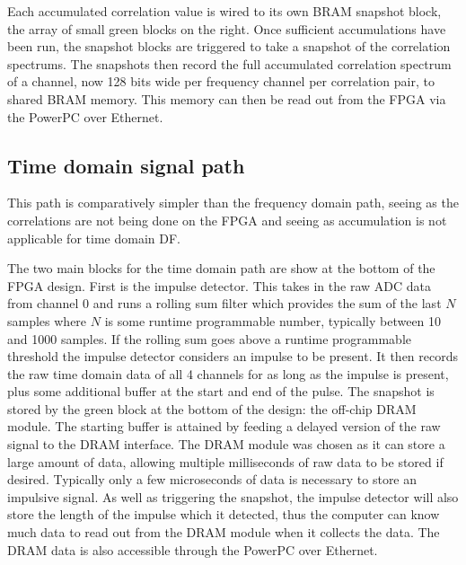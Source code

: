 Each accumulated correlation value is wired to its own BRAM snapshot block, the array of small green blocks on the right. Once sufficient accumulations have been run, the snapshot blocks are triggered to take a snapshot of the correlation spectrums. The snapshots then record the full accumulated correlation spectrum of a channel, now 128 bits wide per frequency channel per correlation pair, to shared BRAM memory. This memory can then be read out from the FPGA via the PowerPC over Ethernet.

\subsection{Time domain signal path}
This path is comparatively simpler than the frequency domain path, seeing as the correlations are not being done on the FPGA and seeing as accumulation is not applicable for time domain DF. 

The two main blocks for the time domain path are show at the bottom of the FPGA design. First is the impulse detector. This takes in the raw ADC data from channel 0 and runs a rolling sum filter which provides the sum of the last \(N\) samples where \(N\) is some runtime programmable number, typically between 10 and 1000 samples. If the rolling sum goes above a runtime programmable threshold the impulse detector considers an impulse to be present. It then records the raw time domain data of all 4 channels for as long as the impulse is present, plus some additional buffer at the start and end of the pulse.  The snapshot is stored by the green block at the bottom of the design: the off-chip DRAM module. The starting buffer is attained by feeding a delayed version of the raw signal to the DRAM interface. The DRAM module was chosen as it can store a large amount of data, allowing multiple milliseconds of raw data to be stored if desired. Typically only a few microseconds of data is necessary to store an impulsive signal. As well as triggering the snapshot, the impulse detector will also store the length of the impulse which it detected, thus the computer can know much data to read out from the DRAM module when it collects the data. The DRAM data is also accessible through the PowerPC over Ethernet.


